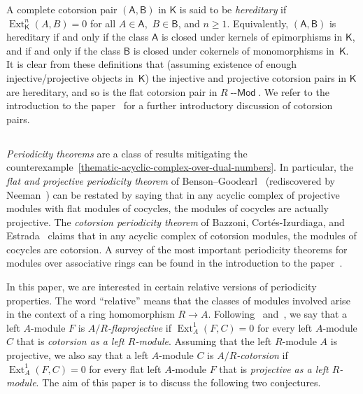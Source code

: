 \documentclass[12pt,a4paper]{amsart}
\newcommand{\+}{\nobreakdash-}
\renewcommand{\:}{\colon}
\newcommand{\rarrow}{\longrightarrow}
\DeclareMathOperator{\Ext}{Ext}
\newcommand{\Modl}{{\operatorname{\mathsf{--Mod}}}}
\newcommand{\sA}{\mathsf A}
\newcommand{\sB}{\mathsf B}
\newcommand{\sK}{\mathsf K}
\theoremstyle{plain}
\theoremstyle{definition}
\begin{document}
 A complete cotorsion pair $(\sA,\sB)$ in $\sK$ is said to be
\emph{hereditary} if $\Ext^n_\sK(A,B)=0$ for all $A\in\sA$, \,$B\in\sB$,
and $n\ge1$.
 Equivalently, $(\sA,\sB)$ is hereditary if and only if the class
$\sA$ is closed under kernels of epimorphisms in $\sK$, and if and only
if the class $\sB$ is closed under cokernels of monomorphisms in~$\sK$.
 It is clear from these definitions that (assuming existence of enough
injective/projective objects in~$\sK$) the injective and projective
cotorsion pairs in $\sK$ are hereditary, and so is the flat cotorsion
pair in $R\Modl$.
 We refer to the introduction to the paper~\cite{Pctrl} for a further
introductory discussion of cotorsion pairs.

\subsection{{}} \label{introd-periodicity-subsecn}
 \emph{Periodicity theorems} are a class of results mitigating
the counterexample~\eqref{thematic-acyclic-complex-over-dual-numbers}.
 In particular, the \emph{flat and projective periodicity theorem}
of Benson--Goodearl~\cite[Theorem~2.5]{BG} (rediscovered by
Neeman~\cite[Remark~2.15]{Neem}) can be restated by saying that
in any acyclic complex of projective modules with flat modules of
cocycles, the modules of cocycles are actually projective.
 The \emph{cotorsion periodicity theorem} of Bazzoni,
Cort\'es-Izurdiaga, and Estrada~\cite[Theorem~1.2(2),
Proposition~4.8(2), or Theorem~5.1(2)]{BCE} claims that in any
acyclic complex of cotorsion modules, the modules of cocycles
are cotorsion.
 A survey of the most important periodicity theorems for modules over
associative rings can be found in the introduction to
the paper~\cite{BHP}.

 In this paper, we are interested in certain relative versions of
periodicity properties.
 The word ``relative'' means that the classes of modules involved
arise in the context of a ring homomorphism $R\rarrow A$.
 Following~\cite[Section~1.6]{Pdomc} and~\cite{PBas}, we say
that a left $A$\+module $F$ is \emph{$A/R$\+flaprojective} if
$\Ext^1_A(F,C)=0$ for every left $A$\+module $C$ that is \emph{cotorsion
as a left $R$\+module}.
 Assuming that the left $R$\+module $A$ is projective, we also say
that a left $A$\+module $C$ is \emph{$A/R$\+cotorsion} if
$\Ext^1_A(F,C)=0$ for every flat left $A$\+module $F$ that is
\emph{projective as a left $R$\+module}.
 The aim of this paper is to discuss the following two conjectures.
\end{document}
